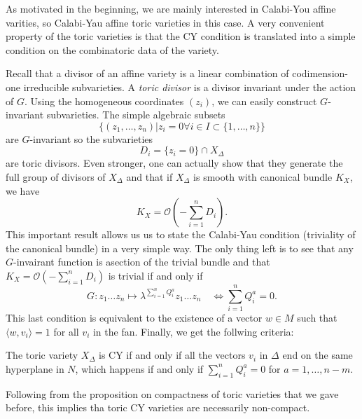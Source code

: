 \documentclass{worksheetclass}
\begin{document}
    As motivated in the beginning, we are mainly interested in Calabi-You affine varities, so Calabi-Yau affine toric varieties in this case. A very convenient property of the toric varieties is that the CY condition is translated into a simple condition on the combinatoric data of the variety.

    Recall that a divisor of an affine variety is a linear combination of codimension-one irreducible subvarieties. A \emph{toric divisor} is a divisor invariant under the action of $G$. Using the homogeneous coordinates $(z_i)$, we can easily construct $G$-invariant subvarieties. The simple algebraic subsets
    \begin{equation}
        \{(z_1,\dots,z_n)|z_i=0 \forall i\in I\subset\{1,\dots,n\}\}
    \end{equation}
    are $G$-invariant so the subvarieties
    \begin{equation}
        D_i=\{z_i=0\}\cap X_\Delta
    \end{equation}
    are toric divisors. Even stronger, one can actually show that they generate the full group of divisors of $X_\Delta$ and that if $X_\Delta$ is smooth with canonical bundle $K_X$, we have
    \begin{equation}
        K_X=\mathcal{O}\left(-\sum^n_{i=1} D_i\right).
    \end{equation}
    This important result allows us us to state the Calabi-Yau condition (triviality of the canonical bundle) in a very simple way. The only thing left is to see that any $G$-invairant function is asection of the trivial bundle and that $K_X=\mathcal{O}\left(-\sum^n_{i=1} D_i\right)$ is trivial if and only if
    \begin{equation}
        G:z_1\dots z_n\mapsto\lambda^{\sum^n_{i=1}Q^a_i}z_1\dots z_n\quad\Leftrightarrow\sum^n_{i=1}Q^a_i=0.
    \end{equation}
    This last condition is equivalent to the existence of a vector $w\in M$ such that $\langle w,v_i\rangle=1$ for all $v_i$ in the fan. Finally, we get the follwing criteria:
    \begin{prop*}
        The toric variety $X_\Delta$ is CY if and only if all the vectors $v_i$ in $\Delta$ end on the same hyperplane in $N$, which happens if and only if $\sum^n_{i=1}Q^a_i=0$ for $a=1,\dots,n-m$.
    \end{prop*}

    Following from the proposition on compactness of toric varieties that we gave before, this implies tha toric CY varieties are necessarily non-compact.
\end{document}
